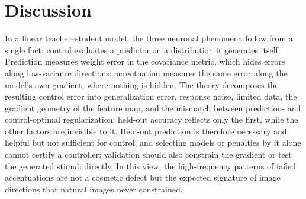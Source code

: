 \section{Discussion}
\label{sec:discussion}
\vspace{-9pt}
{\color{red}In a linear teacher--student model, the three neuronal phenomena follow from a single fact: control evaluates a predictor on a distribution it generates itself. Prediction measures weight error in the covariance metric, which hides errors along low-variance directions; accentuation measures the same error along the model's own gradient, where nothing is hidden. The theory decomposes the resulting control error into generalization error, response noise, limited data, the gradient geometry of the feature map, and the mismatch between prediction- and control-optimal regularization; held-out accuracy reflects only the first, while the other factors are invisible to it. Held-out prediction is therefore necessary and helpful but not sufficient for control, and selecting models or penalties by it alone cannot certify a controller; validation should also constrain the gradient or test the generated stimuli directly. In this view, the high-frequency patterns of failed accentuations are not a cosmetic defect but the expected signature of image directions that natural images never constrained.}

